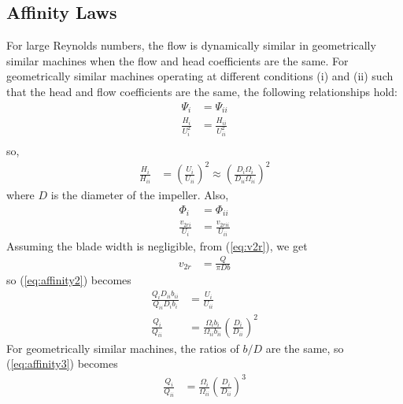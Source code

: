 \subsection{Affinity Laws}
For large Reynolds numbers, the flow is dynamically similar in geometrically similar machines when the flow and head coefficients are the same. For geometrically similar machines operating at different conditions (i) and (ii) such that the head and flow coefficients are the same, the following relationships hold:
\begin{align*}
    \Psi_i &= \Psi_{ii}  \\
    \frac{H_i}{U_i^2} &= \frac{H_{ii}}{U_{ii}^2} \\
\end{align*}
so,
\begin{align}
    \frac{H_i}{H_{ii}} &= \left(\frac{U_i}{U_{ii}}\right)^2 \approx \left(\frac{D_i \Omega_i}{D_{ii} \Omega_{ii}}\right)^2 \label{eq:affinity1}
\end{align}
where $D$ is the diameter of the impeller. Also,
\begin{align}
    \Phi_i &= \Phi_{ii}  \nonumber \\
    \frac{v_{2ri}}{U_i} &= \frac{v_{2rii}}{U_{ii}} \label{eq:affinity2}
\end{align}
Assuming the blade width is negligible, from (\ref{eq:v2r}), we get
\begin{align}
    v_{2r} &= \frac{Q}{\pi D b}
\end{align}
so (\ref{eq:affinity2}) becomes
\begin{align}
    \frac{Q_i D_{ii} b_{ii}}{Q_{ii} D_i b_i} &= \frac{U_i}{U_{ii}} \nonumber \\
    \frac{Q_i}{Q_{ii}} &= \frac{\Omega_i b_i}{\Omega_{ii} b_{ii}} \left(\frac{D_{i}}{D_{ii}}\right)^2 \label{eq:affinity3}
\end{align}
For geometrically similar machines, the ratios of $b/D$ are the same, so (\ref{eq:affinity3}) becomes
\begin{align}
    \frac{Q_i}{Q_{ii}} &= \frac{\Omega_i}{\Omega_{ii}} \left(\frac{D_{i}}{D_{ii}}\right)^3 \label{eq:affinity_law_for_flow}
\end{align}

